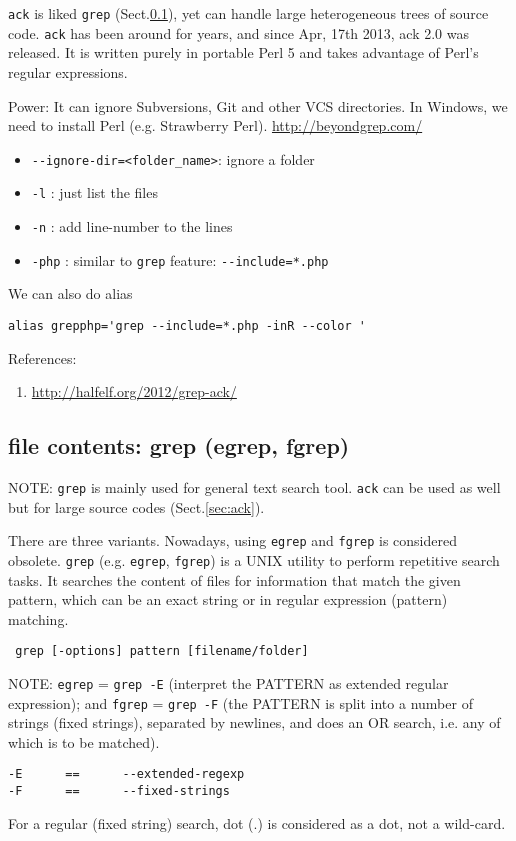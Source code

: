\verb!ack! is liked \verb!grep! (Sect.\ref{sec:grep}), yet can handle large
heterogeneous trees of source code. \verb!ack! has been around for years, and
since Apr, 17th 2013, ack 2.0 was released. It is written purely in portable
Perl 5 and takes advantage of Perl's regular expressions.

Power: It can ignore Subversions, Git and other VCS directories. In Windows, we
need to install Perl (e.g. Strawberry Perl). \url{http://beyondgrep.com/}

\begin{itemize}
  \item \verb!--ignore-dir=<folder_name>!: ignore a folder
  \item \verb!-l! : just list the files
  \item \verb!-n! : add line-number to the lines 
  \item \verb!-php! : similar to \verb!grep! feature: \verb!--include=*.php! 
\end{itemize}

We can also do alias 
\begin{verbatim}
alias grepphp='grep --include=*.php -inR --color '
\end{verbatim}

References:
\begin{enumerate}
  \item \url{http://halfelf.org/2012/grep-ack/}
\end{enumerate}

\subsection{file contents: grep (egrep, fgrep)}
\label{sec:grep}

NOTE: \verb!grep! is mainly used for general text search tool.
\verb!ack! can be used as well but for large source codes (Sect.\ref{sec:ack}).



\begin{mdframed}

There are three variants. Nowadays, using \verb!egrep! and \verb!fgrep! is
considered obsolete. \verb!grep! (e.g. \verb!egrep!, \verb!fgrep!) is a UNIX
utility to perform repetitive search tasks. It searches the content of files for information that
match the given pattern, which can be an exact string or in regular expression
(pattern) matching. 
\begin{verbatim}
 grep [-options] pattern [filename/folder]
\end{verbatim}

NOTE: \verb!egrep!  = \verb!grep -E! (interpret the PATTERN as extended regular
expression); and \verb!fgrep! = \verb!grep -F! (the PATTERN is split into
a number of strings (fixed strings), separated by newlines, and does an
OR search, i.e. any of which is to be matched).
\begin{verbatim}
-E      ==      --extended-regexp
-F      ==      --fixed-strings
\end{verbatim}
For a regular (fixed string) search, dot (.) is considered as a dot, not a
wild-card.

\end{mdframed}

